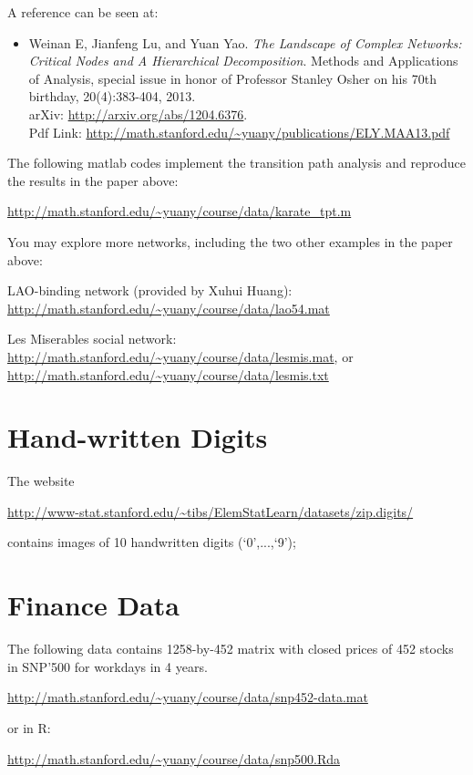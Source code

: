 \documentclass[11pt]{article}
\begin{document}
A reference can be seen at:
\begin{itemize}
\item Weinan E, Jianfeng Lu, and Yuan Yao. {\it The Landscape of Complex Networks: Critical Nodes and A Hierarchical Decomposition}. Methods and Applications of Analysis, special issue in honor of Professor Stanley Osher on his 70th birthday, 20(4):383-404, 2013. \\ arXiv: \url{http://arxiv.org/abs/1204.6376}. \\
Pdf Link: \url{http://math.stanford.edu/~yuany/publications/ELY.MAA13.pdf} 
\end{itemize}

The following matlab codes implement the transition path analysis and reproduce the results in the paper above:

\url{http://math.stanford.edu/~yuany/course/data/karate_tpt.m}

You may explore more networks, including the two other examples in the paper above:

LAO-binding network (provided by Xuhui Huang): \url{http://math.stanford.edu/~yuany/course/data/lao54.mat}

Les Miserables social network: \url{http://math.stanford.edu/~yuany/course/data/lesmis.mat}, or \url{http://math.stanford.edu/~yuany/course/data/lesmis.txt}

\section{Hand-written Digits} The website 

\url{http://www-stat.stanford.edu/\~tibs/ElemStatLearn/datasets/zip.digits/}

\noindent contains images of 10 handwritten digits (`$0$',...,`9');

\section{Finance Data}
The following data contains 1258-by-452 matrix with closed prices of 452 stocks in SNP'500 for workdays in 4 years.

\url{http://math.stanford.edu/~yuany/course/data/snp452-data.mat} 

\noindent or in R: 

\url{http://math.stanford.edu/~yuany/course/data/snp500.Rda}

\end{document}
